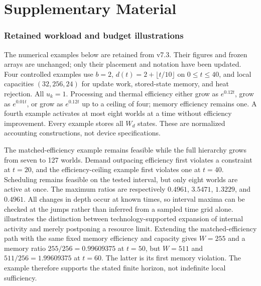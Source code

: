 \clearpage
{}
\label{page:supplement-start}
\part*{Supplementary Material}
\suppressfloats[t]
\setcounter{section}{0}
\renewcommand{\thesection}{S\arabic{section}}
\renewcommand{\theHsection}{supp.\arabic{section}}
\renewcommand{\theHfigure}{supp.\arabic{figure}}
\renewcommand{\theHtable}{supp.\arabic{table}}
\setcounter{figure}{0}
\setcounter{table}{0}
\section{Retained workload and budget illustrations}
\label{supp:workload}
The numerical examples below are retained from v7.3. Their figures and frozen
arrays are unchanged; only their placement and notation have been updated.
Four controlled examples use $b=2$, $d(t)=2+\lfloor t/10\rfloor$ on $0\leq t\leq40$, and local capacities $(32,256,24)$ for update work, stored-state memory, and heat rejection. All $u_k=1$. Processing and thermal efficiency either grow as $e^{0.12t}$, grow as $e^{0.01t}$, or grow as $e^{0.12t}$ up to a ceiling of four; memory efficiency remains one. A fourth example activates at most eight worlds at a time without efficiency improvement. Every example stores all $W_d$ states. These are normalized accounting constructions, not device specifications.

The matched-efficiency example remains feasible while the full hierarchy grows from seven to 127 worlds. Demand outpacing efficiency first violates a constraint at $t=20$, and the efficiency-ceiling example first violates one at $t=40$. Scheduling remains feasible on the tested interval, but only eight worlds are active at once. The maximum ratios are respectively $0.4961$, $3.5471$, $1.3229$, and $0.4961$. All changes in depth occur at known times, so interval maxima can be checked at the jumps rather than inferred from a sampled time grid alone.  illustrates the distinction between technology-supported expansion of internal activity and merely postponing a resource limit. Extending the matched-efficiency path with the same fixed memory efficiency and capacity gives $W=255$ and a memory ratio $255/256=0.99609375$ at $t=50$, but $W=511$ and $511/256=1.99609375$ at $t=60$. The latter is its first memory violation. The example therefore supports the stated finite horizon, not indefinite local sufficiency.

